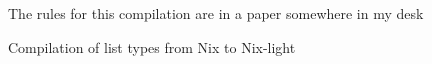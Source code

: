 \begin{figure}
  \center
  The rules for this compilation are in a paper somewhere in my desk
  \caption{Compilation of list types from Nix to Nix-light}\label{typage::listes::compilation}
\end{figure}
